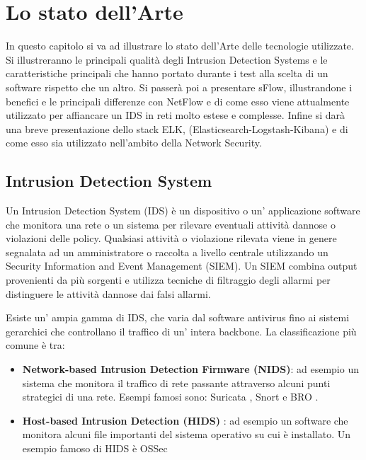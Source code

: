 \documentclass[12pt,a4paper,openright,twoside]{report}
\begin{document}
\chapter{Lo stato dell'Arte}                %
\lhead[\fancyplain{}{\bfseries\thepage}]{\fancyplain{}{\bfseries\rightmark}}
In questo capitolo si va ad illustrare lo stato dell'Arte delle tecnologie utilizzate.
Si illustreranno le principali qualit\`a degli Intrusion Detection Systems e le caratteristiche
principali che hanno portato durante i test alla scelta di un software rispetto che un altro.
Si passer\`a poi a presentare sFlow, illustrandone i benefici e le principali differenze
con NetFlow e di come esso viene attualmente utilizzato per affiancare un IDS in reti
molto estese e complesse.
Infine si dar\`a una breve presentazione dello stack ELK, (Elasticsearch-Logstash-Kibana)
e di come esso sia utilizzato nell'ambito della Network Security.
\section{Intrusion Detection System}
Un Intrusion Detection System (IDS) \cite{K4} \`e un dispositivo o un' applicazione software
che monitora una rete o un sistema per rilevare eventuali attivit\`a dannose o violazioni
delle policy. Qualsiasi attivit\`a o violazione rilevata viene in genere segnalata
ad un amministratore o raccolta a livello centrale utilizzando un
Security Information and Event Management (SIEM).
Un SIEM combina output provenienti da pi\`u sorgenti e utilizza tecniche di filtraggio
degli allarmi per distinguere le attivit\`a dannose dai falsi allarmi.

Esiste un' ampia gamma di IDS, che varia dal software antivirus fino ai sistemi gerarchici
che controllano il traffico di un' intera backbone. La classificazione pi\`u comune
\`e tra:
\begin{itemize}
  \item {\bf Network-based Intrusion Detection Firmware (NIDS)}: ad esempio un sistema
  che monitora il traffico di rete passante attraverso alcuni punti strategici di una
  rete. Esempi famosi sono: Suricata \cite{K6} , Snort \cite{K7} e BRO \cite{K8} .
  \item {\bf Host-based Intrusion Detection (HIDS)} : ad esempio un software che monitora
  alcuni file importanti del sistema operativo su cui \`e installato. Un esempio famoso
  di HIDS \`e OSSec \cite{K5}
\end{itemize}
\end{document}
